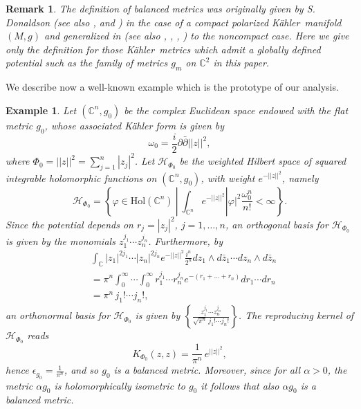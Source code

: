 \documentclass[11pt, reqno]{amsart}
\newtheorem{ex}{Example}
\newtheorem{remar}[theor]{Remark}
\begin{document}
\begin{remar}\rm
The definition of balanced metrics
 was originally given by S. Donaldson \cite{donaldson} (see also \cite{arezzoloi}, \cite{balancedC} and \cite{regcov}) in the case of  a compact polarized {K\"{a}hler}\ manifold $(M, g)$ and generalized in \cite{arezzoloi} (see also \cite{globsymp}, \cite{englisweigh}, \cite{grecoloi},  \cite{hartogsbalanced} \cite{cartanbalanced}) to the noncompact case. Here we give only the definition for those {K\"{a}hler}\ metrics which admit a globally defined potential such as the family of metrics $g_m$ on ${\mathbb{C}}^2$ in this paper.
 \end{remar}

We describe now a well-known example which is the prototype of our analysis.

\begin{ex}\label{c0}\rm
Let $({\mathbb{C}}^n, g_0)$ be the complex Euclidean space endowed with the flat metric $g_0$, whose associated K\"ahler form is given by
$$\omega_0=\frac{i}{2}{\partial}\bar{\partial}||z||^2,$$
where $\Phi_0= ||z||^2=\sum_{j=1}^n|z_j|^2$. Let ${\mathcal{H}}_{\Phi_0}$ be the weighted Hilbert space of squared integrable holomorphic functions on $({\mathbb{C}}^n,  g_{0})$, with weight  $e^{-||z||^2}$, namely
$${\mathcal{H}}_{\Phi_0}=\left\{ \varphi\in{\mathrm{Hol}}({\mathbb{C}}^n)\ | \  \int_{{\mathbb{C}}^n}e^{-||z||^2}|\varphi|^2 \frac{\omega_{0}^n}{n!}<\infty \right\}.$$
Since the potential depends on $r_j = |z_j|^2$, $j = 1, \dots, n$, an orthogonal basis for ${\mathcal{H}}_{\Phi_0}$ is given by the monomials $z_1^{j_1}\cdots z_n^{j_n}$.
Furthermore, by
\begin{equation}
\begin{split}
&\int_{\mathbb{C}} |z_1|^{2j_1}\cdots |z_n|^{2j_n}e^{-  ||z||^2}\frac{i^n}{2^n}dz_1\wedge d\bar z_1\cdots dz_n\wedge d\bar z_n \\
&=\pi^n\int_0^\infty \cdots \int_0^\infty r_1^{j_1}\cdots r_n^{j_n} e^{-(r_1+\dots +r_n)}dr_1\cdots dr_n\\
&={\pi^n\, j_1!\cdots j_n!},
\end{split}
\end{equation}
an orthonormal  basis for  ${\mathcal{H}}_{\Phi_0}$ is given by $\left\{\frac{ z_1^{j_1}\cdots z_n^{j_n} }{\sqrt{\pi^n}\,j_1!\cdots j_n!}\right\}$. The reproducing kernel of
${\mathcal{H}}_{\Phi_0}$  reads
$$K_{\Phi_0}(z, z)=\frac{ 1 }{\pi^n}\,e^{  ||z||^2},$$
hence $\epsilon_{ g_0}=\frac{ 1 }{\pi^n}$, and so
$g_0$ is  a balanced metric. Moreover, since for all $\alpha >0$,  the metric   $\alpha g_0$ is holomorphically isometric to $g_0$ it follows that
also $\alpha g_0$ is  a balanced metric.
\end{ex}
\end{document}
